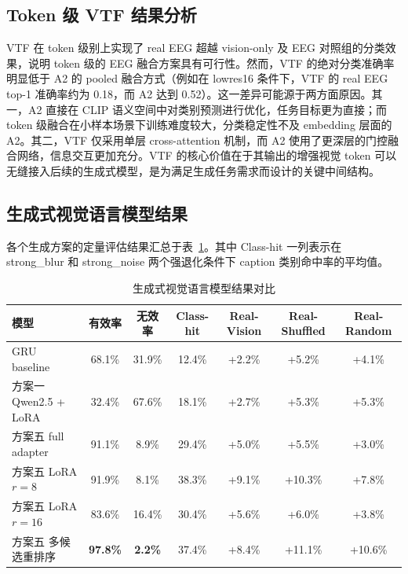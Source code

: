 \subsection{Token 级 VTF 结果分析}

VTF 在 token 级别上实现了 real EEG 超越 vision-only 及 EEG 对照组的分类效果，说明 token 级的 EEG 融合方案具有可行性。然而，VTF 的绝对分类准确率明显低于 A2 的 pooled 融合方式（例如在 lowres16 条件下，VTF 的 real EEG top-1 准确率约为 0.18，而 A2 达到 0.52）。这一差异可能源于两方面原因。其一，A2 直接在 CLIP 语义空间中对类别预测进行优化，任务目标更为直接；而 token 级融合在小样本场景下训练难度较大，分类稳定性不及 embedding 层面的 A2。其二，VTF 仅采用单层 cross-attention 机制，而 A2 使用了更深层的门控融合网络，信息交互更加充分。VTF 的核心价值在于其输出的增强视觉 token 可以无缝接入后续的生成式模型，是为满足生成任务需求而设计的关键中间结构。

\subsection{生成式视觉语言模型结果}

各个生成方案的定量评估结果汇总于表~\ref{tab:evlm-results}。其中 Class-hit 一列表示在 strong\_blur 和 strong\_noise 两个强退化条件下 caption 类别命中率的平均值。

\begin{table}[htbp]
  \centering
  \caption{生成式视觉语言模型结果对比}
  \label{tab:evlm-results}
  \begin{tabular}{l c c c c c c}
    \toprule
    模型 & 有效率 & 无效率 & Class-hit & Real-Vision & Real-Shuffled & Real-Random \\
    \midrule
    GRU baseline & 68.1\% & 31.9\% & 12.4\% & +2.2\% & +5.2\% & +4.1\% \\
    方案一 Qwen2.5 + LoRA & 32.4\% & 67.6\% & 18.1\% & +2.7\% & +5.3\% & +5.3\% \\
    方案五 full adapter & 91.1\% & 8.9\% & 29.4\% & +5.0\% & +5.5\% & +3.0\% \\
    方案五 LoRA $r=8$ & 91.9\% & 8.1\% & 38.3\% & +9.1\% & +10.3\% & +7.8\% \\
    方案五 LoRA $r=16$ & 83.6\% & 16.4\% & 30.4\% & +5.6\% & +6.0\% & +3.8\% \\
    方案五 多候选重排序 & \textbf{97.8\%} & \textbf{2.2\%} & 37.4\% & +8.4\% & +11.1\% & +10.6\% \\
    \bottomrule
  \end{tabular}
\end{table}

